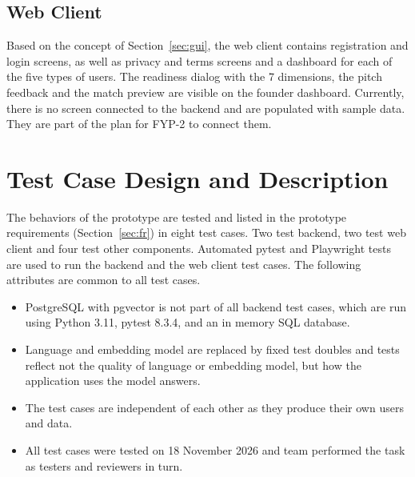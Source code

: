 \documentclass{FastFyp}
\begin{document}
\subsection{Web Client}\label{sec:impl-frontend}
Based on the concept of Section~\ref{sec:gui}, the web client contains registration and login screens, as well as privacy and terms screens and a dashboard for each of the five types of users. The readiness dialog with the 7 dimensions, the pitch feedback and the match preview are visible on the founder dashboard. Currently, there is no screen connected to the backend and are populated with sample data. They are part of the plan for FYP-2 to connect them.

\section{Test Case Design and Description}\label{sec:tcd}
The behaviors of the prototype are tested and listed in the prototype requirements (Section~\ref{sec:fr}) in eight test cases. Two test backend, two test web client and four test other components. Automated pytest and Playwright tests are used to run the backend and the web client test cases. The following attributes are common to all test cases.
\begin{itemize}
\item PostgreSQL with pgvector is not part of all backend test cases, which are run using Python 3.11, pytest 8.3.4, and an in memory SQL database.
\item Language and embedding model are replaced by fixed test doubles and tests reflect not the quality of language or embedding model, but how the application uses the model answers.
\item The test cases are independent of each other as they produce their own users and data.
\item All test cases were tested on 18 November 2026 and team performed the task as testers and reviewers in turn.
\end{itemize}
\end{document}
